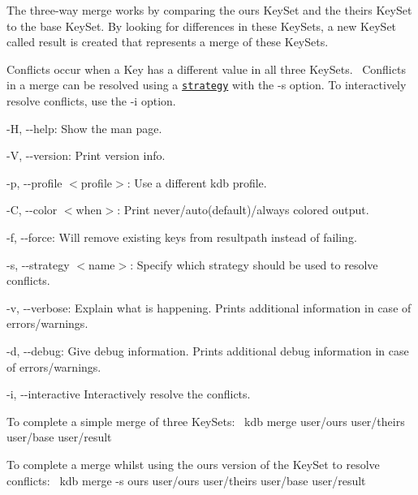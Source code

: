 The three-\/way merge works by comparing the {\ttfamily ours} Key\+Set and the {\ttfamily theirs} Key\+Set to the {\ttfamily base} Key\+Set. By looking for differences in these Key\+Sets, a new Key\+Set called {\ttfamily result} is created that represents a merge of these Key\+Sets.~\newline


Conflicts occur when a Key has a different value in all three Key\+Sets.~\newline
 Conflicts in a merge can be resolved using a \href{#STRATEGIES}{\tt strategy} with the {\ttfamily -\/s} option. To interactively resolve conflicts, use the {\ttfamily -\/i} option.


\begin{DoxyItemize}
\item {\ttfamily -\/H}, {\ttfamily -\/-\/help}\+: Show the man page.
\item {\ttfamily -\/V}, {\ttfamily -\/-\/version}\+: Print version info.
\item {\ttfamily -\/p}, {\ttfamily -\/-\/profile $<$profile$>$}\+: Use a different kdb profile.
\item {\ttfamily -\/C}, {\ttfamily -\/-\/color $<$when$>$}\+: Print never/auto(default)/always colored output.
\item {\ttfamily -\/f}, {\ttfamily -\/-\/force}\+: Will remove existing keys from {\ttfamily resultpath} instead of failing.
\item {\ttfamily -\/s}, {\ttfamily -\/-\/strategy $<$name$>$}\+: Specify which strategy should be used to resolve conflicts.
\item {\ttfamily -\/v}, {\ttfamily -\/-\/verbose}\+: Explain what is happening. Prints additional information in case of errors/warnings.
\item {\ttfamily -\/d}, {\ttfamily -\/-\/debug}\+: Give debug information. Prints additional debug information in case of errors/warnings.
\item {\ttfamily -\/i}, {\ttfamily -\/-\/interactive} Interactively resolve the conflicts.
\end{DoxyItemize}

To complete a simple merge of three Key\+Sets\+:~\newline
 {\ttfamily kdb merge user/ours user/theirs user/base user/result}~\newline


To complete a merge whilst using the {\ttfamily ours} version of the Key\+Set to resolve conflicts\+:~\newline
 {\ttfamily kdb merge -\/s ours user/ours user/theirs user/base user/result}~\newline


